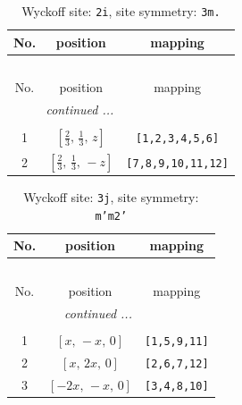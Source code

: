 \documentclass[fleqn,8pt]{jsarticle}
\begin{document}
\renewcommand{\arraystretch}{1.2}
\begin{longtable}{ccc}
\caption{Wyckoff site: {\tt 2i}, site symmetry: {\tt 3m.}}
 \\
 \hline \hline
No. & position & mapping \\ \hline \endfirsthead

\multicolumn{2}{l}{\tablename\ \thetable{}} \\
 \hline \hline
No. & position & mapping \\ \hline \endhead

 \hline \hline
\multicolumn{2}{r}{\footnotesize\it continued ...} \\ \endfoot

 \hline \hline
\multicolumn{2}{r}{} \\ \endlastfoot

1 & $\left[ \frac{2}{3},\, \frac{1}{3},\, z \right]$ & {\tt [1,2,3,4,5,6]} \\ \hline
2 & $\left[ \frac{2}{3},\, \frac{1}{3},\, - z \right]$ & {\tt [7,8,9,10,11,12]} \\
\end{longtable}
\renewcommand{\arraystretch}{1.2}
\begin{longtable}{ccc}
\caption{Wyckoff site: {\tt 3j}, site symmetry: {\tt m'm2'}}
 \\
 \hline \hline
No. & position & mapping \\ \hline \endfirsthead

\multicolumn{2}{l}{\tablename\ \thetable{}} \\
 \hline \hline
No. & position & mapping \\ \hline \endhead

 \hline \hline
\multicolumn{2}{r}{\footnotesize\it continued ...} \\ \endfoot

 \hline \hline
\multicolumn{2}{r}{} \\ \endlastfoot

1 & $\left[ x,\, - x,\, 0 \right]$ & {\tt [1,5,9,11]} \\ \hline
2 & $\left[ x,\, 2 x,\, 0 \right]$ & {\tt [2,6,7,12]} \\ \hline
3 & $\left[ - 2 x,\, - x,\, 0 \right]$ & {\tt [3,4,8,10]} \\
\end{longtable}
\renewcommand{\arraystretch}{1.2}
\end{document}
